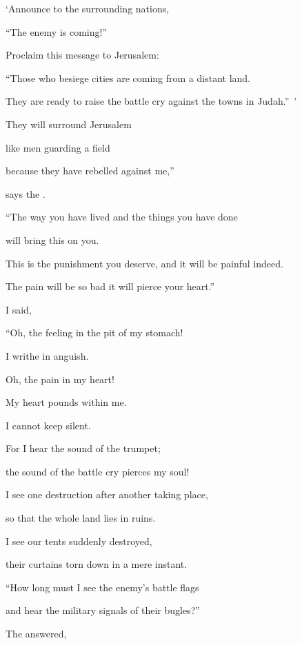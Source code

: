{\par }{\Q ‘Announce
to the surrounding nations,
\par }{\Q “The enemy is coming!”

\par }{\Q Proclaim this
message to Jerusalem:
\par }{\Q “Those who besiege
cities are coming
from a distant
land.
\par }{\Q They are ready to raise
the battle cry
against
the towns
in Judah.” ’
\par }{\Q {}They will surround
Jerusalem

\par }{\Q like men guarding
a field
\par }{\Q because
they have rebelled
against me,”
\par }{\Q says
the
{}.
\par }{\Q {}“The way
you have lived and the things
you have done
\par }{\Q will bring this
on you.
\par }{\Q This
is the punishment you deserve, and it will be painful indeed.
\par }{\Q The pain will be so
bad it
will pierce
your heart.”
\par }{\PP {}I said,

\par }{\Q “Oh, the feeling in the pit
of my stomach!

\par }{\Q I writhe in anguish.
\par }{\Q Oh, the pain
in my heart!

\par }{\Q My heart
pounds
within me.
\par }{\Q I cannot
keep silent.
\par }{\Q For
I hear
the sound
of the trumpet;
\par }{\Q the sound of the battle
cry
pierces my soul!
\par }{\Q {}I see one destruction
after another
taking place,
\par }{\Q so that
the whole
land
lies in ruins.
\par }{\Q I see our tents
suddenly
destroyed,
\par }{\Q their curtains torn
down in a mere instant.
\par }{\Q {}“How long
must I see
the enemy’s battle flags
\par }{\Q and hear
the military signals
of their bugles?”
\par }{\PP {}The
{} answered,

}
